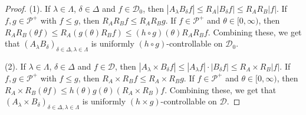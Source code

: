 \documentclass[12pt,a4paper]{amsart}
\theoremstyle{plain}
\theoremstyle{definition}
\numberwithin{equation}{section}
\begin{document}
\begin{proof}
  (1). 
  If $\lambda \in \Lambda$, $\delta \in \Delta$ and $f\in \mathcal D_0$, then $|A_\lambda B_\delta f| \leq R_A |B_\delta f| \leq R_A R_B |f|$.
  If $f,g \in \mathcal P^+$ with $f\leq g$, then $R_AR_Bf \leq R_A R_B g$.
  If $f \in \mathcal P^+$ and $\theta \in [0,\infty)$, then $R_AR_B(\theta f) \leq R_A(g(\theta) R_Bf) \leq (h\circ g)(\theta) R_A R_B f $.
  Combining these, we get that
  $(A_\lambda B_\delta)_{\delta\in \Delta, \lambda \in \Lambda}$ is uniformly $(h \circ g)$-controllable on $\mathcal D_0$.
  
  (2). 
  If $\lambda \in \Lambda$, $\delta \in \Delta$ and $f\in \mathcal D$, then $|A_\lambda \times B_\delta f| \leq |A_\lambda f| \cdot |B_\delta f| \leq R_A \times R_B |f|$.
  If $f,g \in \mathcal P^+$ with $f\leq g$, then $R_A\times R_Bf \leq R_A\times R_B g$.
  If $f \in \mathcal P^+$ and $\theta \in [0,\infty)$, then $R_A\times R_B (\theta f) \leq h(\theta) g(\theta) (R_A \times R_B) f $.
  Combining these, we get that $(A_\lambda \times B_\delta)_{\delta\in \Delta, \lambda \in \Lambda}$ is uniformly $(h \times g)$-controllable on $\mathcal D$.
  

\end{proof}
\end{document}
